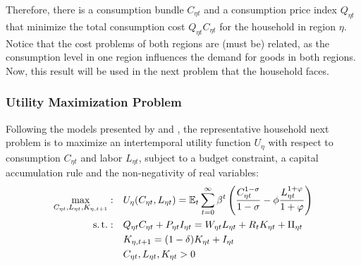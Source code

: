 \documentclass[../thesis.tex]{subfiles}
\begin{document}

	Therefore, there is a consumption bundle \(C_{\eta t}\) and a consumption price index \(Q_{\eta t}\) that minimize the total consumption cost \(Q_{\eta t} C_{\eta t}\) for the household in region \(\eta\). Notice that the cost problems of both regions are (must be) related, as the consumption level in one region influences the demand for goods in both regions. Now, this result will be used in the next problem that the household faces.

\subsubsection*{Utility Maximization Problem}

	Following the models presented by \textcite{costa_junior_understanding_2016} and \textcite{solis-garcia_ucb_2022}, the representative household next problem is to maximize an intertemporal utility function $U_{\eta}$ with respect to consumption $C_{\eta t}$ and labor $L_{\eta t}$, subject to a budget constraint, a capital accumulation rule and the non-negativity of real variables:
	\begin{align}
		\max_{C_{\eta t}, L_{\eta t}, K_{\eta,t+1}}: &\quad U_{\eta}(C_{\eta t},L_{\eta t}) = {\mathbb{E}_{t}} \sum_{t=0}^{\infty} \beta^t \left(\frac{C_{\eta t}^{1-\sigma}}{1-\sigma} - \phi \frac{L_{\eta t}^{1+\varphi}}{1+\varphi} \right) \label{eq_v2:reg-utility-function} 
		\\
		\operatorname{s.t.}: &\quad Q_{\eta t} C_{\eta t} + P_{\eta t} I_{\eta t} = W_{\eta t} L_{\eta t} + R_{t} K_{\eta t} + \Pi_{\eta t} \label{eq_v2:reg-budget-constraint} \\
		&\quad K_{\eta,t+1} = (1 - \delta) K_{\eta t} + I_{\eta t} \label{eq_v2:reg-law-of-motion-of-capital} \\
		&\quad C_{\eta t}, L_{\eta t}, K_{\eta t} > 0 \nonumber
	\end{align}
\end{document}
